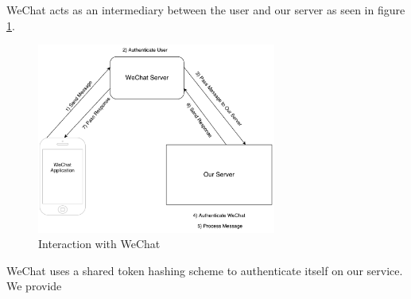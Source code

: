 WeChat acts as an intermediary between the user and our server as seen in figure \ref{fig:wechat_interaction}. 

\begin{figure}
  \centering
    \includegraphics[width=0.7\textwidth]{figs/Wechat_interaction.pdf}
   \caption{Interaction with WeChat} 
   \label{fig:wechat_interaction}
\end{figure}

WeChat uses a shared token hashing scheme to authenticate itself on our service. We provide 